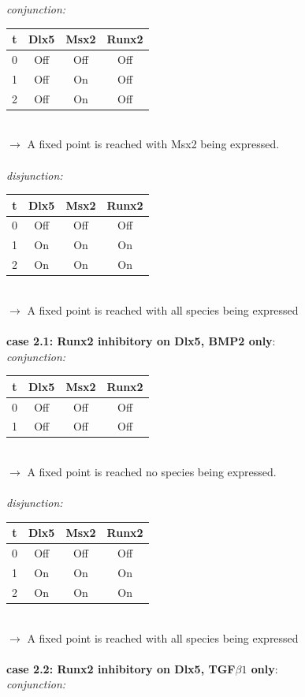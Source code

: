 \documentclass[11pt]{article}
\begin{document}
\begin{appendices}
\textit{conjunction:}
\\ 
\begin{tabular}{c c c c}
t & Dlx5 & Msx2 & Runx2 \\
\hline
0 & Off & Off & Off \\
1 & Off & On & Off \\
2 & Off & On & Off
\end{tabular}
\\
$\rightarrow$ A fixed point is reached with Msx2 being expressed.  
\\ \\
\textit{disjunction:}
\\ 
\begin{tabular}{c c c c}
t & Dlx5 & Msx2 & Runx2 \\
\hline
0 & Off & Off & Off \\
1 & On & On & On \\
2 & On & On & On
\end{tabular}
\\
$\rightarrow$ A fixed point is reached with all species being expressed
\\ \\
\textbf{case 2.1: Runx2 inhibitory on Dlx5, BMP2 only}: \\
\textit{conjunction:}
\\
\begin{tabular}{c c c c}
t & Dlx5 & Msx2 & Runx2 \\
\hline
0 & Off & Off & Off \\
1 & Off & Off & Off
\end{tabular}
\\
$\rightarrow$ A fixed point is reached no species being expressed.  
\\ \\
\textit{disjunction:}
\\ 
\begin{tabular}{c c c c}
t & Dlx5 & Msx2 & Runx2 \\
\hline
0 & Off & Off & Off \\
1 & On & On & On \\
2 & On & On & On
\end{tabular}
\\
$\rightarrow$ A fixed point is reached with all species being expressed
\\ \\
\textbf{case 2.2: Runx2 inhibitory on Dlx5, TGF$\beta1$ only}: \\
\textit{conjunction:}
\\ 

\end{appendices}
\end{document}
